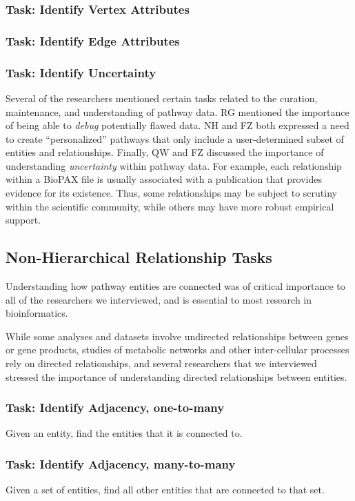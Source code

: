 \documentclass{egpubl}
\begin{document}
\subsubsection{Task: Identify Vertex Attributes}
\subsubsection{Task: Identify Edge Attributes}
\subsubsection{Task: Identify Uncertainty}
Several of the researchers mentioned certain tasks related to the curation, maintenance, and understanding of pathway data. RG mentioned the importance of being able to \emph{debug} potentially flawed data. NH and FZ both expressed a need to create ``personalized'' pathways that only include a user-determined subset of entities and relationships. Finally, QW and FZ discussed the importance of understanding \emph{uncertainty} within pathway data. For example, each relationship within a BioPAX file is usually associated with a publication that provides evidence for its existence. Thus, some relationships may be subject to scrutiny within the scientific community, while others may have more robust empirical support.

\subsection{Non-Hierarchical Relationship Tasks}

Understanding how pathway entities are connected was of critical importance to all of the researchers we interviewed, and is essential to most research in bioinformatics.

While some analyses and datasets involve undirected relationships between genes or gene products, studies of metabolic networks and other inter-cellular processes rely on directed relationships, and several researchers that we interviewed stressed the importance of understanding directed relationships between entities.

\subsubsection{Task: Identify Adjacency, one-to-many}
Given an entity, find the entities that it is connected to.

\subsubsection{Task: Identify Adjacency, many-to-many}
Given a set of entities, find all other entities that are connected to that set.
\end{document}
